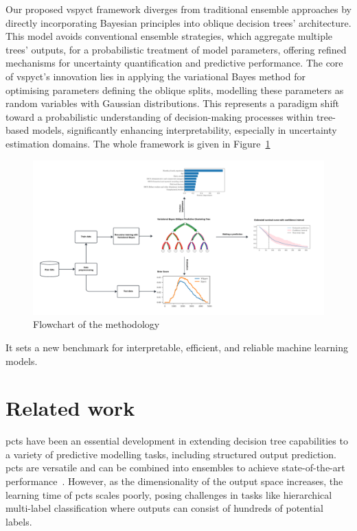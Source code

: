 \documentclass[3p,review,authoryear]{elsarticle}
\begin{document}
Our proposed \gls{vspyct} framework diverges from traditional ensemble approaches by directly incorporating Bayesian principles into oblique decision trees' architecture.
This model avoids conventional ensemble strategies, which aggregate multiple trees' outputs, for a probabilistic treatment of model parameters, offering refined mechanisms for uncertainty quantification and predictive performance.
The core of \gls{vspyct}'s innovation lies in applying the variational Bayes method for optimising parameters defining the oblique splits, modelling these parameters as random variables with Gaussian distributions.
This represents a paradigm shift toward a probabilistic understanding of decision-making processes within tree-based models, significantly enhancing interpretability, especially in uncertainty estimation domains.
The whole framework is given in Figure~\ref{fig:flowchart}

\begin{figure}[h!]
    \centering
    \includegraphics[width=1.0\textwidth]{methodology_flowchart.pdf}
    \caption{Flowchart of the methodology}
    \label{fig:flowchart}
\end{figure}

It sets a new benchmark for interpretable, efficient, and reliable machine learning models.


\section{Related work}


\Glspl{pct} have been an essential development in extending decision tree capabilities to a variety of predictive modelling tasks, including structured output prediction.
\Glspl{pct} are versatile and can be combined into ensembles to achieve state-of-the-art performance~\citep{Kocev_2013}.
However, as the dimensionality of the output space increases, the learning time of \glspl{pct} scales poorly, posing challenges in tasks like hierarchical multi-label classification where outputs can consist of hundreds of potential labels.
\end{document}

